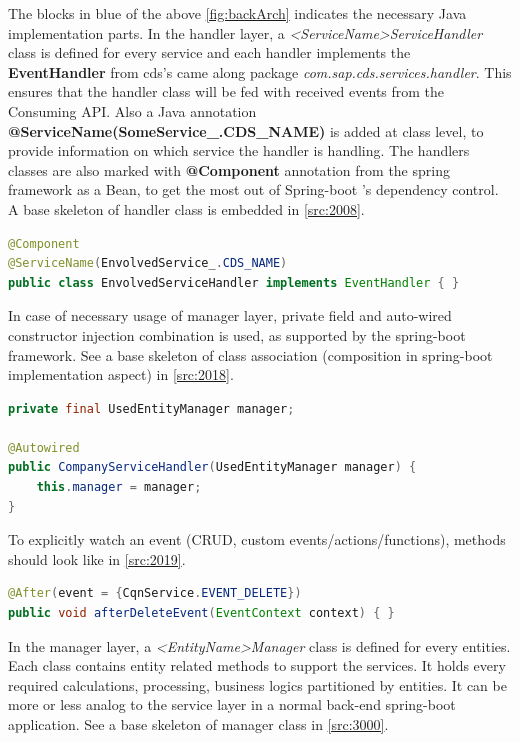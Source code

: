 The blocks in blue of the above \autoref{fig:backArch} indicates the necessary Java implementation parts. 
In the handler layer, a \textit{<ServiceName>ServiceHandler} class is defined for every service and each handler implements the \textbf{EventHandler} \cite{cap-java-event-handler} from cds's came along package \textit{com.sap.cds.services.handler}. This ensures that the handler class will be fed with received events from the Consuming API. Also a Java annotation \textbf{@ServiceName(SomeService\_.CDS\_NAME)} is added at class level, to provide information on which service the handler is handling. The handlers classes are also marked with \textbf{@Component} annotation from the spring framework as a Bean, to get the most out of Spring-boot \cite{springboot-doc}'s dependency control. A base skeleton of handler class is embedded in \autoref{src:2008}.

\begin{lstlisting}[language={java}]
@Component
@ServiceName(EnvolvedService_.CDS_NAME)
public class EnvolvedServiceHandler implements EventHandler { }
\end{lstlisting}

In case of necessary usage of manager layer, private field and auto-wired constructor injection combination is used, as supported by the spring-boot framework. See a base skeleton of class association (composition in spring-boot implementation aspect) in \autoref{src:2018}.

\begin{lstlisting}[language={java}]
private final UsedEntityManager manager;

@Autowired
public CompanyServiceHandler(UsedEntityManager manager) {
    this.manager = manager;
}
\end{lstlisting}

To explicitly watch an event (CRUD, custom events/actions/functions), methods should look like in \autoref{src:2019}.
\begin{lstlisting}[language={java}]
@After(event = {CqnService.EVENT_DELETE})
public void afterDeleteEvent(EventContext context) { }
\end{lstlisting}

\bigskip
In the manager layer, a \textit{<EntityName>Manager} class is defined for every entities. Each class contains entity related methods to support the services. It holds every required calculations, processing, business logics partitioned by entities. It can be more or less analog to the service layer in a normal back-end spring-boot application.
See a base skeleton of manager class in \autoref{src:3000}.

